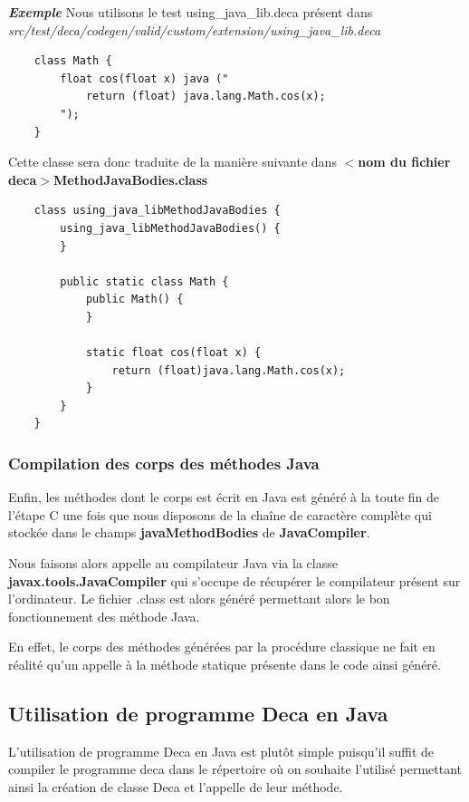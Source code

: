 \documentclass[12pt, a4paper, one side]{article}
\begin{document}
    \textbf{\textit{Exemple}}
    Nous utilisons le test using\_java\_lib.deca présent dans \textit{src/test/deca/codegen/valid/custom/extension/using\_java\_lib.deca}


    \begin{verbatim}
    class Math {
        float cos(float x) java ("
            return (float) java.lang.Math.cos(x);
        ");
    }
    \end{verbatim}

    Cette classe sera donc traduite de la manière suivante dans \textbf{$<$nom du fichier deca$>$MethodJavaBodies.class}

    \begin{verbatim}
    class using_java_libMethodJavaBodies {
        using_java_libMethodJavaBodies() {
        }

        public static class Math {
            public Math() {
            }

            static float cos(float x) {
                return (float)java.lang.Math.cos(x);
            }
        }
    }
    \end{verbatim}

    \subsubsection{Compilation des corps des méthodes Java}
    Enfin, les méthodes dont le corps est écrit en Java est généré à la toute fin de l'étape C une fois que nous disposons de la chaîne de caractère complète qui stockée dans le champs \textbf{javaMethodBodies} de \textbf{JavaCompiler}.

    Nous faisons alors appelle au compilateur Java via la classe \textbf{javax.tools.JavaCompiler}\cite{ref_javacompiler} qui s'occupe de récupérer le compilateur présent sur l'ordinateur. Le fichier .class est alors généré permettant alors le bon fonctionnement des méthode Java.

    En effet, le corps des méthodes générées par la procédure classique ne fait en réalité qu'un appelle à la méthode statique présente dans le code ainsi généré.

    \subsection{Utilisation de programme Deca en Java}
    L'utilisation de programme Deca en Java est plutôt simple puisqu'il suffit de compiler le programme deca dans le répertoire où on souhaite l'utilisé permettant ainsi la création de classe Deca et l'appelle de leur méthode.
\end{document}
